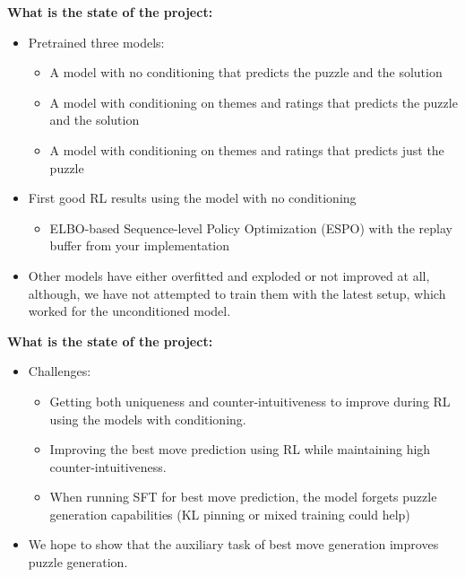 \documentclass{beamer}
\begin{document}
\begin{frame}
    \textbf{What is the state of the project:}
    \begin{itemize}
        \item Pretrained three models:
        \begin{itemize}
            \item A model with no conditioning that predicts the puzzle and the solution
            \item A model with conditioning on themes and ratings that predicts the puzzle and the solution
            \item A model with conditioning on themes and ratings that predicts just the puzzle
        \end{itemize}
        \item First good RL results using the model with no conditioning
        \begin{itemize}
            \item ELBO-based Sequence-level Policy Optimization (ESPO) with the replay buffer from your implementation 
        \end{itemize}
        \item Other models have either overfitted and exploded or not improved at all, although, we have not attempted to train them with the latest setup, which worked for the unconditioned model.
    \end{itemize}
\end{frame}

\begin{frame}
    \textbf{What is the state of the project:}
    \begin{itemize}
        \item Challenges:
        \begin{itemize}
            \item Getting both uniqueness and counter-intuitiveness to improve during RL using the models with conditioning.
            \item Improving the best move prediction using RL while maintaining high counter-intuitiveness.
            \item When running SFT for best move prediction, the model forgets puzzle generation capabilities (KL pinning or mixed training could help)
        \end{itemize}
    \item We hope to show that the auxiliary task of best move generation improves puzzle generation.
    \end{itemize}
\end{frame}
\end{document}
